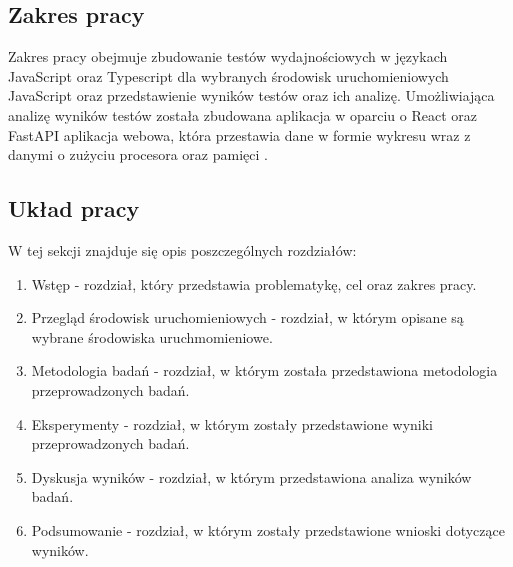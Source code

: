 \subsection*{Zakres pracy}
Zakres pracy obejmuje zbudowanie testów wydajnościowych w językach JavaScript oraz Typescript dla wybranych środowisk uruchomieniowych JavaScript oraz przedstawienie wyników testów oraz ich analizę. Umożliwiająca analizę wyników testów została zbudowana aplikacja w oparciu o React \cite{React} oraz FastAPI \cite{FastAPI} aplikacja webowa, która przestawia dane w formie wykresu wraz z danymi o zużyciu procesora oraz pamięci .

\subsection*{Układ pracy}
W tej sekcji znajduje się opis poszczególnych rozdziałów:
\begin{enumerate}
  \item Wstęp - rozdział, który przedstawia problematykę, cel oraz zakres pracy.
  \item Przegląd środowisk uruchomieniowych - rozdział, w którym opisane są wybrane środowiska uruchmomieniowe.
  \item Metodologia badań - rozdział, w którym została przedstawiona metodologia przeprowadzonych badań.
  \item Eksperymenty - rozdział, w którym zostały przedstawione wyniki przeprowadzonych badań.
  \item Dyskusja wyników - rozdział, w którym przedstawiona analiza wyników badań.
  \item Podsumowanie - rozdział, w którym zostały przedstawione wnioski dotyczące wyników.
\end{enumerate}
